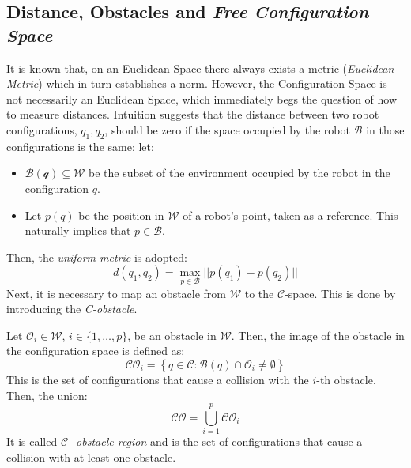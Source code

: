                    \subsection{Distance, Obstacles and \textit{Free Configuration Space}}
                        It is known that, on an Euclidean Space there always exists a metric (\textit{Euclidean Metric}) which in turn establishes a norm. However, the Configuration Space is not necessarily an Euclidean Space, which immediately begs the question of how to measure distances. Intuition suggests that the distance between two robot configurations, $q_1,q_2$, should be zero if the space occupied by the robot $\mathcal{B}$ in those configurations is the same; let:
                        \begin{itemize}
                            \item $\mathcal{B(q)}\subseteq\mathcal{W}$ be the subset of the environment occupied by the robot in the configuration $q$.
                            \item Let $p(q)$ be the position in $\mathcal{W}$ of a robot's point, taken as a reference. This naturally implies that $p\in\mathcal{B}$.
                        \end{itemize}
                        Then, the \textit{uniform metric} is adopted:
                        \begin{equation}\label{uniform_C_space_norm}
                            d(q_1,q_2)=\max_{p\in\mathcal{B}} ||p(q_1)-p(q_2)||
                        \end{equation}
                        Next, it is necessary to map an obstacle from $\mathcal{W}$ to the $\mathcal{C}$-space. This is done by introducing the \textit{C-obstacle}.
                        \begin{definition}
                            Let $\mathcal{O}_{i}\in\mathcal{W}$, $i \in \{1,\dots,p\}$, be an obstacle in $\mathcal{W}$. Then, the image of the obstacle in the configuration space is defined as:
                            \begin{equation}\label{C_obstacle_image}
                                \mathcal{CO}_{i}=\left\{q \in \mathcal{C}: \mathcal{B}(q) \cap \mathcal{O}_{i} \neq \emptyset \right\}
                            \end{equation}
                            This is the set of configurations that cause a collision with the $i$-th obstacle. Then, the union:
                            \begin{equation}\label{C_osbstacle}
                                \mathcal{CO}=\bigcup_{i=1}^{p}\mathcal{CO}_{i}
                            \end{equation}
                            It is called $\mathcal{C}$\textit{- obstacle region} and is the set of configurations that cause a collision with at least one obstacle.
                        \end{definition}
